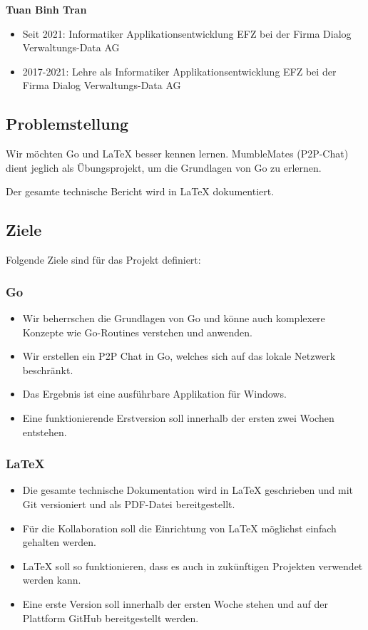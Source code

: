 \textbf{Tuan Binh Tran}
\begin{itemize}
    \item Seit 2021: Informatiker Applikationsentwicklung EFZ bei der Firma Dialog Verwaltungs-Data AG
    \item 2017-2021: Lehre als Informatiker Applikationsentwicklung EFZ bei der Firma Dialog Verwaltungs-Data AG
\end{itemize}

\subsection{Problemstellung}
Wir möchten Go und LaTeX besser kennen lernen. MumbleMates (P2P-Chat) dient jeglich als Übungsprojekt, um die Grundlagen von Go zu erlernen.
\newline

Der gesamte technische Bericht wird in LaTeX dokumentiert.


\subsection{Ziele}

Folgende Ziele sind für das Projekt definiert:

\subsubsection{Go}
\begin{itemize}
    \item Wir beherrschen die Grundlagen von Go und könne auch komplexere Konzepte wie Go-Routines verstehen und anwenden.
    \item Wir erstellen ein P2P Chat in Go, welches sich auf das lokale Netzwerk beschränkt.
    \item Das Ergebnis ist eine ausführbare Applikation für Windows.
    \item Eine funktionierende Erstversion soll innerhalb der ersten zwei Wochen entstehen.
\end{itemize}

\subsubsection{LaTeX}

\begin{itemize}
    \item Die gesamte technische Dokumentation wird in LaTeX geschrieben und mit Git versioniert und als PDF-Datei bereitgestellt.
    \item Für die Kollaboration soll die Einrichtung von LaTeX möglichst einfach gehalten werden.
    \item LaTeX soll so funktionieren, dass es auch in zukünftigen Projekten verwendet werden kann.
    \item Eine erste Version soll innerhalb der ersten Woche stehen und auf der Plattform GitHub bereitgestellt werden.
\end{itemize}

